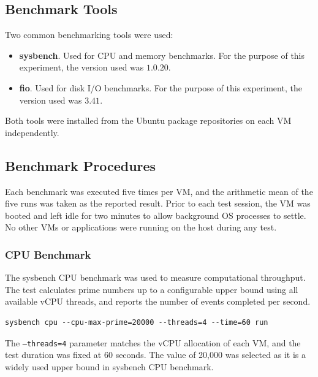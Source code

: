 \documentclass[a4paper, 12pt]{article}
\theoremstyle{plain}
\theoremstyle{definition}
\theoremstyle{remark}
\begin{document}
    \subsection{Benchmark Tools}

    Two common benchmarking tools were used:

    \begin{itemize}
        \item \textbf{sysbench}. Used for CPU and memory benchmarks. For the purpose of this experiment, the version used was $1.0.20$.
        \item \textbf{fio}. Used for disk I/O benchmarks. For the purpose of this experiment, the version used was $3.41$.
    \end{itemize}

    \noindent Both tools were installed from the Ubuntu package repositories on each VM
    independently.

    \subsection{Benchmark Procedures}

    Each benchmark was executed five times per VM, and the arithmetic mean of
    the five runs was taken as the reported result. Prior to each test session,
    the VM was booted and left idle for two minutes to allow background OS
    processes to settle. No other VMs or applications were running on the host
    during any test.

    \subsubsection{CPU Benchmark}

    The sysbench CPU benchmark was used to measure computational throughput.
    The test calculates prime numbers up to a configurable upper bound using
    all available vCPU threads, and reports the number of events completed per
    second.

    \begin{lstlisting}[caption={sysbench CPU benchmark command.}]
    sysbench cpu --cpu-max-prime=20000 --threads=4 --time=60 run
    \end{lstlisting}

    \noindent The \texttt{--threads=4} parameter matches the vCPU allocation of each VM,
    and the test duration was fixed at 60 seconds. The value of 20{,}000 was selected 
    as it is a widely used upper bound in sysbench CPU benchmark.
\end{document}
